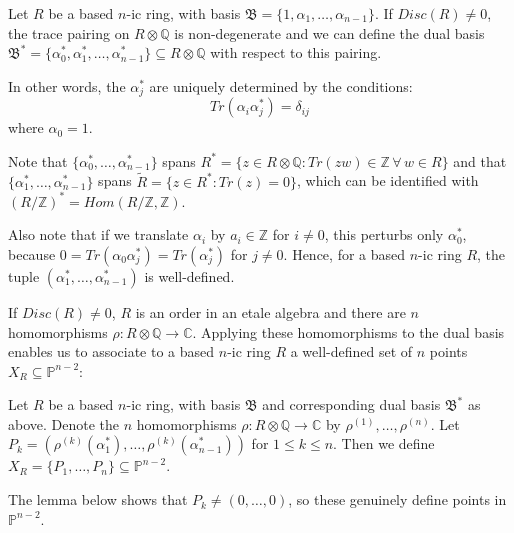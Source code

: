 \documentclass{report}
\begin{document}
\begin{definition}
Let $R$ be a based $n$-ic ring, with basis $\mathfrak{B} = \{1,\alpha_1,\ldots,\alpha_{n-1} \}$.  If $Disc(R) \neq 0$, the trace pairing on $R \otimes \mathbb{Q}$ is non-degenerate and we can define the dual basis $\mathfrak{B}^* = \{\alpha_0^*,\alpha_1^*,\ldots,\alpha_{n-1}^* \} \subseteq R \otimes \mathbb{Q}$ with respect to this pairing.

In other words, the $\alpha_j^*$ are uniquely determined by the conditions:
\begin{equation}
Tr(\alpha_i \alpha_j^*) = \delta_{ij}
\end{equation}
where $\alpha_0 = 1$.
\end{definition}

Note that $\{\alpha_0^*,\ldots,\alpha_{n-1}^*\}$ spans $R^* = \{z \in R \otimes \mathbb{Q} : Tr(zw) \in \mathbb{Z} \, \forall \, w \in R \}$ and that $\{\alpha_1^*,\ldots,\alpha_{n-1}^*\}$ spans $\tilde{R} = \{ z \in R^* : Tr(z) = 0 \}$, which can be identified with $(R / \mathbb{Z})^* = Hom(R / \mathbb{Z}, \mathbb{Z})$.

Also note that if we translate $\alpha_i$ by $a_i \in \mathbb{Z}$ for $i \neq 0$, this perturbs only $\alpha_0^*$, because $0 = Tr(\alpha_0 \alpha_j^*) = Tr(\alpha_j^*)$ for $j \neq 0$.  Hence, for a based $n$-ic ring $R$, the tuple $(\alpha_1^*,\ldots,\alpha_{n-1}^*)$ is well-defined.

If $Disc(R) \neq 0$, $R$ is an order in an etale algebra and there are $n$ homomorphisms $\rho : R \otimes \mathbb{Q} \to \mathbb{C}$.  Applying these homomorphisms to the dual basis enables us to associate to a based $n$-ic ring $R$ a well-defined set of $n$ points $X_R \subseteq \mathbb{P}^{n-2}$:

\begin{definition} \label{X_R def}
Let $R$ be a based $n$-ic ring, with basis $\mathfrak{B}$ and corresponding dual basis $\mathfrak{B}^*$ as above.  Denote the $n$ homomorphisms $\rho : R \otimes \mathbb{Q} \to \mathbb{C}$ by $\rho^{(1)},\ldots,\rho^{(n)}$.  Let $P_k = (\rho^{(k)}(\alpha_1^*),\ldots,\rho^{(k)}(\alpha_{n-1}^*))$ for $1 \leq k \leq n$.  Then we define $X_R = \{ P_1,\ldots,P_n \} \subseteq \mathbb{P}^{n-2}$.
\end{definition}

The lemma below shows that $P_k \neq (0,\ldots,0)$, so these genuinely define points in $\mathbb{P}^{n-2}$.
\end{document}
